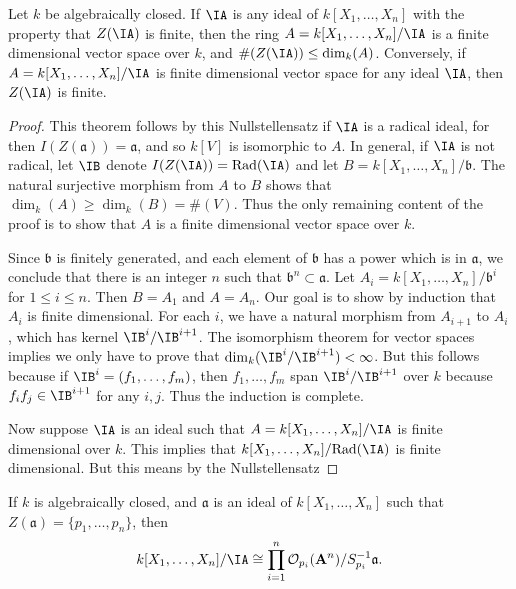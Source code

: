 \begin{lemma}
    Let $k$ be algebraically closed. If $\IA$ is any ideal of $k[X_1,\dots,X_n]$ with the property that $Z(\IA)$ is finite, then the ring $A = k[X_1,\dots,X_n] / \IA$ is a finite dimensional vector space over $k$, and $\#(Z(\IA)) \leq \dim_k(A)$. Conversely, if $A = k[X_1,\dots,X_n] / \IA$ is finite dimensional vector space for any ideal $\IA$, then $Z(\IA)$ is finite.
\end{lemma}
\begin{proof}
    This theorem follows by this Nullstellensatz if $\IA$ is a radical ideal, for then $I(Z(\mathfrak{a})) = \mathfrak{a}$, and so $k[V]$ is isomorphic to $A$. In general, if $\IA$ is not radical, let $\IB$ denote $I(Z(\IA)) = \text{Rad}(\IA)$ and let $B = k[X_1,\dots,X_n]/\mathfrak{b}$. The natural surjective morphism from $A$ to $B$ shows that $\dim_k(A) \geq \dim_k(B) = \#(V)$. Thus the only remaining content of the proof is to show that $A$ is a finite dimensional vector space over $k$.

    Since $\mathfrak{b}$ is finitely generated, and each element of $\mathfrak{b}$ has a power which is in $\mathfrak{a}$, we conclude that there is an integer $n$ such that $\mathfrak{b}^n \subset \mathfrak{a}$. Let $A_i = k[X_1,\dots,X_n]/\mathfrak{b}^i$ for $1 \leq i \leq n$. Then $B = A_1$ and $A = A_n$. Our goal is to show by induction that $A_i$ is finite dimensional. For each $i$, we have a natural morphism from $A_{i+1}$ to $A_i$, which has kernel $\IB^i/\IB^{i+1}$. The isomorphism theorem for vector spaces implies we only have to prove that $\dim_k(\IB^i/\IB^{i+1}) < \infty$. But this follows because if $\IB^i = (f_1,\dots,f_m)$, then $f_1,\dots,f_m$ span $\IB^i/\IB^{i+1}$ over $k$ because $f_if_j \in \IB^{i+1}$ for any $i,j$. Thus the induction is complete.

    Now suppose $\IA$ is an ideal such that $A = k[X_1,\dots,X_n]/\IA$ is finite dimensional over $k$. This implies that $k[X_1,\dots,X_n]/\text{Rad}(\IA)$ is finite dimensional. But this means by the Nullstellensatz
\end{proof}

\begin{theorem}
    If $k$ is algebraically closed, and $\mathfrak{a}$ is an ideal of $k[X_1,\dots,X_n]$ such that $Z(\mathfrak{a}) = \{ p_1,\dots,p_n \}$, then
    \[ k[X_1,\dots,X_n]/\IA \cong \prod_{i = 1}^n \mathcal{O}_{p_i}(\mathbf{A}^n) / S_{p_i}^{-1} \mathfrak{a}. \]
\end{theorem}

